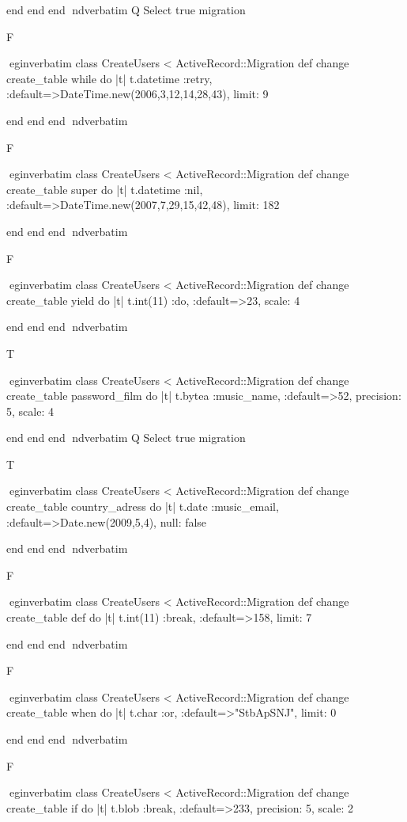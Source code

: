     end 
  end 
end
nd{verbatim}
Q
 Select true migration

F

egin{verbatim}
 class CreateUsers < ActiveRecord::Migration 
  def change 
    create_table while do |t| 
      t.datetime :retry, :default=>DateTime.new(2006,3,12,14,28,43), limit: 9
    
    end 
  end 
end
nd{verbatim}

F

egin{verbatim}
 class CreateUsers < ActiveRecord::Migration 
  def change 
    create_table super do |t| 
      t.datetime :nil, :default=>DateTime.new(2007,7,29,15,42,48), limit: 182
    
    end 
  end 
end
nd{verbatim}

F

egin{verbatim}
 class CreateUsers < ActiveRecord::Migration 
  def change 
    create_table yield do |t| 
      t.int(11) :do, :default=>23, scale: 4
    
    end 
  end 
end
nd{verbatim}

T

egin{verbatim}
 class CreateUsers < ActiveRecord::Migration 
  def change 
    create_table password_film do |t| 
      t.bytea :music_name, :default=>52, precision: 5, scale: 4
    
    end 
  end 
end
nd{verbatim}
Q
 Select true migration

T

egin{verbatim}
 class CreateUsers < ActiveRecord::Migration 
  def change 
    create_table country_adress do |t| 
      t.date :music_email, :default=>Date.new(2009,5,4), null: false
    
    end 
  end 
end
nd{verbatim}

F

egin{verbatim}
 class CreateUsers < ActiveRecord::Migration 
  def change 
    create_table def do |t| 
      t.int(11) :break, :default=>158, limit: 7
    
    end 
  end 
end
nd{verbatim}

F

egin{verbatim}
 class CreateUsers < ActiveRecord::Migration 
  def change 
    create_table when do |t| 
      t.char :or, :default=>"StbApSNJ", limit: 0
    
    end 
  end 
end
nd{verbatim}

F

egin{verbatim}
 class CreateUsers < ActiveRecord::Migration 
  def change 
    create_table if do |t| 
      t.blob :break, :default=>233, precision: 5, scale: 2
    
